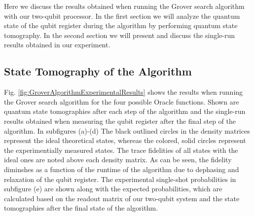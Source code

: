 Here we discuss the results obtained when running the Grover search algorithm with our two-qubit processor. In the first section we will analyze the quantum state of the qubit register during the algorithm by performing quantum state tomography. In the second section we will present and discuss the single-run results obtained in our experiment.

\subsection{State Tomography of the Algorithm}

Fig. \ref{fig:GroverAlgorithmExperimentalResults} shows the results when running the Grover search algorithm for the four possible Oracle functions. Shown are quantum state tomographies after each step of the algorithm and the single-run results obtained when measuring the qubit register after the final step of the algorithm. In subfigures  (a)-(d) The black outlined circles in the density matrices represent the ideal theoretical states, whereas the colored, solid circles represent the experimentially measured states. The trace fidelities of all states with the ideal ones are noted above each density matrix. As can be seen, the fidelity diminshes as a function of the runtime of the algorithm due to dephasing and relaxation of the qubit register. The experimental single-shot probabilities in subfigure (e) are shown along with the expected probabilities, which are calculated based on the readout matrix of our two-qubit system and the state tomographies after the final state of the algorithm. 

